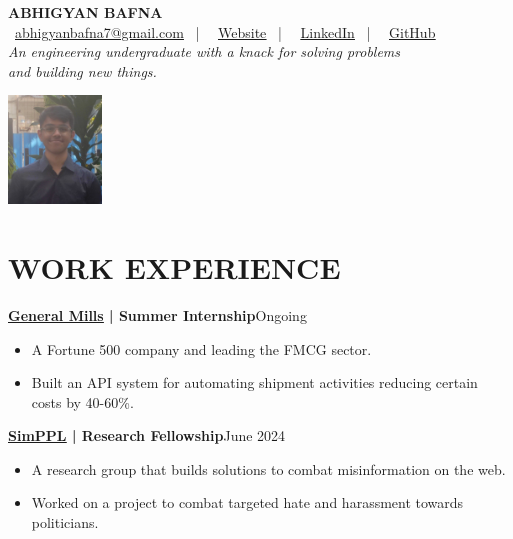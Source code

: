 \documentclass[a4paper,11pt]{article}
\newcommand{\entry}[2]{
  \noindent\textbf{#1}\hfill{#2}\\[-1em]
}
\newcommand{\contactlink}[2]{
    \href{#1}{\color{cyan}\underline{#2}}
}
\newenvironment{itemizeWithPadding}{
  \begin{itemize}
}{
  \end{itemize}
  \vspace{0.5em} %
}
\begin{document}
\begin{minipage}{0.87\textwidth}
{\headingfont\textbf{\huge ABHIGYAN BAFNA}}\\[0.5em]
\faEnvelope\,\contactlink{mailto:abhigyanbafna7@gmail.com}{abhigyanbafna7@gmail.com} \ | \
\faGlobe\,\contactlink{https://abhigyan.tech}{Website} \ | \
\faLinkedinSquare\,\contactlink{https://www.linkedin.com/in/abhigyan-bafna}{LinkedIn} \ | \
\faGithub\,\contactlink{https://github.com/abhigyan-bafna}{GitHub}\\[0.5em]
\textit{An engineering undergraduate with a knack for solving problems\\and building new things.}
\end{minipage}
\hfill
\begin{minipage}{0.13\textwidth}
\includegraphics[width=2.5cm]{profilePicture.jpg}
\end{minipage}

\section*{WORK EXPERIENCE}

\entry{\contactlink{https://www.generalmills.co.in/}{General Mills} | Summer Internship}{Ongoing}
\begin{itemizeWithPadding}
  \item A Fortune 500 company and leading the FMCG sector.
  \item Built an API system for automating shipment activities reducing certain costs by 40-60\%.
\end{itemizeWithPadding}

\entry{\contactlink{https://simppl.org/}{SimPPL} | Research Fellowship}{June 2024}
\begin{itemizeWithPadding}
  \item A research group that builds solutions to combat misinformation on the web.
  \item Worked on a project to combat targeted hate and harassment towards politicians.
\end{itemizeWithPadding}
\end{document}
